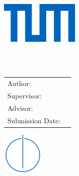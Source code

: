 \begin{titlepage}
  \centering


\includegraphics[height=20mm]{media/logo_tum.png}


  \vspace{5mm}
  {\huge\MakeUppercase{\getFaculty{}}}\\

  \vspace{5mm}
  {\large\MakeUppercase{\getUniversity{}}}\\

  \vspace{20mm}
  {\Large \getDoctype{}}

  \makeatletter
  \vspace{15mm}
  {
  {\huge\bfseries \getTitle{}}

  \vspace{10mm}
  {\huge\bfseries \foreignlanguage{ngerman}{\getTitleGer{}}}
  }
  {
  {\huge\bfseries \getTitleGer{}}

  \vspace{10mm}
  {\huge\bfseries \foreignlanguage{english}{\getTitle{}}}
  }
  \makeatother

  \vspace{15mm}
  \begin{tabular}{l l}
    Author:          & \getAuthor{} \\
    Supervisor:      & \getSupervisor{} \\
    Advisor:         & \getAdvisor{} \\
    Submission Date: & \getSubmissionDate{} \\
  \end{tabular}

    \vfill{}
    \includegraphics[height=20mm]{media/logo_faculty.png}

\end{titlepage}
